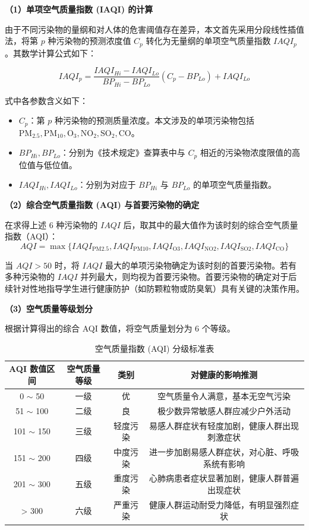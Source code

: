 \documentclass[a4paper, 12pt]{ctexart} %
\begin{document}
\textbf{（1）单项空气质量指数 (IAQI) 的计算}

由于不同污染物的量纲和对人体的危害阈值存在差异，本文首先采用分段线性插值法，将第 $p$ 种污染物的预测浓度值 $C_p$ 转化为无量纲的单项空气质量指数 $IAQI_p$。其数学计算公式如下：

\begin{equation}
IAQI_p = \frac{IAQI_{Hi} - IAQI_{Lo}}{BP_{Hi} - BP_{Lo}} (C_p - BP_{Lo}) + IAQI_{Lo}
\end{equation}

式中各参数含义如下：
\begin{itemize}
    \item $C_p$：第 $p$ 种污染物的预测质量浓度。本文涉及的单项污染物包括 $\text{PM}_{2.5}, \text{PM}_{10}, \text{O}_3, \text{NO}_2, \text{SO}_2, \text{CO}$。
    \item $BP_{Hi}, BP_{Lo}$：分别为《技术规定》查算表中与 $C_p$ 相近的污染物浓度限值的高位值与低位值。
    \item $IAQI_{Hi}, IAQI_{Lo}$：分别为对应于 $BP_{Hi}$ 与 $BP_{Lo}$ 的单项空气质量指数。
\end{itemize}

\textbf{（2）综合空气质量指数 (AQI) 与首要污染物的确定}

在求得上述 6 种污染物的 $IAQI$ 后，取其中的最大值作为该时刻的综合空气质量指数（AQI）：
\begin{equation}
AQI = \max \{IAQI_{\text{PM}2.5}, IAQI_{\text{PM}10}, IAQI_{\text{O}3}, IAQI_{\text{NO}2}, IAQI_{\text{SO}2}, IAQI_{\text{CO}}\}
\end{equation}

当 $AQI > 50$ 时，将 $IAQI$ 最大的单项污染物确定为该时刻的首要污染物。若有多种污染物的 $IAQI$ 并列最大，则均视为首要污染物。首要污染物的确定对于后续针对性地指导学生进行健康防护（如防颗粒物或防臭氧）具有关键的决策作用。

\textbf{（3）空气质量等级划分}

根据计算得出的综合 AQI 数值，将空气质量划分为 6 个等级。
\begin{table}[htbp]
\centering
\caption{空气质量指数 (AQI) 分级标准表}
\label{tab:aqi_standard}
\hspace*{-1.2cm}
\begin{tabular}{cccc}
\hline
\textbf{AQI 数值区间} & \textbf{空气质量等级} & \textbf{类别} & \textbf{对健康的影响推测} \\ \hline
0 $\sim$ 50 & 一级 & 优 & 空气质量令人满意，基本无空气污染 \\
51 $\sim$ 100 & 二级 & 良 & 极少数异常敏感人群应减少户外活动 \\
101 $\sim$ 150 & 三级 & 轻度污染 & 易感人群症状有轻度加剧，健康人群出现刺激症状 \\
151 $\sim$ 200 & 四级 & 中度污染 & 进一步加剧易感人群症状，对心脏、呼吸系统有影响 \\
201 $\sim$ 300 & 五级 & 重度污染 & 心肺病患者症状显著加剧，健康人群普遍出现症状 \\
> 300 & 六级 & 严重污染 & 健康人群运动耐受力降低，有明显强烈症状 \\ \hline
\end{tabular}
\end{table}
\end{document}

